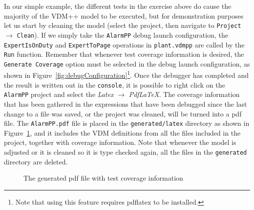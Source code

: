 In our simple example, the different tests in the exercise above do cause the majority of the VDM++ model to be executed, but for demonstration purposes let us start by cleaning the model (select the project, then navigate to \texttt{Project} $\rightarrow$ \texttt{Clean}). If we simply take the \texttt{AlarmPP} debug launch configuration, the \verb|ExpertIsOnDuty| and \verb|ExpertToPage| operations in \verb|plant.vdmpp| are called by the \texttt{Run} function. Remember that whenever test coverage information is desired, the \texttt{Generate Coverage} option must be selected in the debug launch configuration, as shown in Figure~\ref{fig:debugConfiguration}\footnote{Note that using this feature requires pdflatex to be installed.}. Once the debugger has completed and the result is written out in the \texttt{console}, it is possible to right click on the \texttt{AlarmPP} project and select the \emph{Latex} $ \rightarrow $ \emph{PdfLaTeX}. The coverage information that has been gathered in the expressions that have been debugged since the last change to a file was saved, or the project was cleaned, will be turned into a pdf file. The \texttt{AlarmPP.pdf} file is placed in the \texttt{generated/latex} directory as shown in Figure~\ref{fig:testcov}, and it includes the
VDM definitions from all the files included in the project, together with coverage information. Note that whenever the model is adjusted or it is cleaned so it is type checked again, all the files in the \texttt{generated} directory are deleted.
%
\begin{figure}[tb]
\begin{center}
\end{center}
\caption{The generated pdf file with test coverage information\label{fig:testcov}}
\end{figure}

